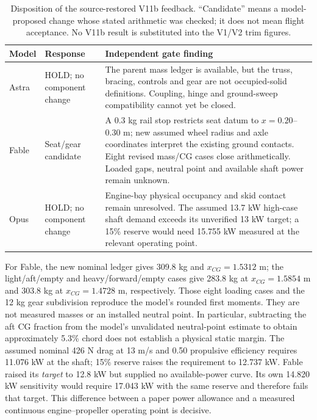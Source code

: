 \documentclass[11pt,a4paper]{article}
\begin{document}
\begin{table}[H]\centering\small
\caption{Disposition of the source-restored V11b feedback. ``Candidate'' means a model-proposed change whose stated arithmetic was checked; it does not mean flight acceptance. No V11b result is substituted into the V1/V2 trim figures.}\label{tab:v11b}
\begin{tabularx}{\linewidth}{@{}p{16mm}p{31mm}X@{}}\toprule
Model & Response & Independent gate finding\\\midrule
Astra & HOLD; no component change & The parent mass ledger is available, but the truss, bracing, controls and gear are not occupied-solid definitions. Coupling, hinge and ground-sweep compatibility cannot yet be closed.\\
Fable & Seat/gear candidate & A 0.3 kg rail stop restricts seat datum to $x=0.20$--$0.30$ m; new assumed wheel radius and axle coordinates interpret the existing ground contacts. Eight revised mass/CG cases close arithmetically. Loaded gaps, neutral point and available shaft power remain unknown.\\
Opus & HOLD; no component change & Engine-bay physical occupancy and skid contact remain unresolved. The assumed 13.7 kW high-case shaft demand exceeds its unverified 13 kW target; a 15\% reserve would need 15.755 kW measured at the relevant operating point.\\\bottomrule
\end{tabularx}
\end{table}

For Fable, the new nominal ledger gives 309.8 kg and $x_{CG}=1.5312$ m; the light/aft/empty and heavy/forward/empty cases give 283.8 kg at $x_{CG}=1.5854$ m and 303.8 kg at $x_{CG}=1.4728$ m, respectively. Those eight loading cases and the 12 kg gear subdivision reproduce the model's rounded first moments. They are not measured masses or an installed neutral point. In particular, subtracting the aft CG fraction from the model's unvalidated neutral-point estimate to obtain approximately 5.3\% chord does not establish a physical static margin. The assumed nominal 426 N drag at 13 m/s and 0.50 propulsive efficiency requires 11.076 kW at the shaft; 15\% reserve raises the requirement to 12.737 kW. Fable raised its \emph{target} to 12.8 kW but supplied no available-power curve. Its own 14.820 kW sensitivity would require 17.043 kW with the same reserve and therefore fails that target. This difference between a paper power allowance and a measured continuous engine--propeller operating point is decisive.
\end{document}
